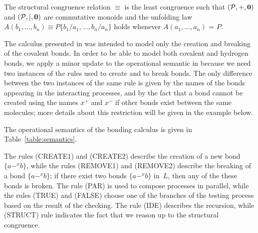 \documentclass[runningheads]{llncs}
\newcommand{\mP}{\mathcal{P}}
\begin{document}
The structural congruence relation $\equiv$ is the least congruence such 
that $(\mP,+,{\bf 0})$ and $(\mP,\mid,{\bf 0})$ are commutative monoids 
and the unfolding law $A(b_1,\ldots,b_n) \equiv 
P\{b_1/a_1,\ldots,b_n/a_n\}$ holds whenever $A(a_1,\ldots,a_n)$ = $P$.

The calculus presented in \cite{NaCo18} was intended to model only the 
creation and breaking of the covalent bonds. In order to be able to model 
both covalent and hydrogen bonds, we apply a minor update to the 
operational semantic in \cite{NaCo18} because we need two instances of the 
rules used to create and to break bonds. The only difference between the 
two instances of the same rule is given by the names of the bonds 
appearing in the interacting processes, and by the fact that a bond cannot 
be created using the names $x^+$ and $x^-$ if other bonds exist between 
the same molecules; more details about this restriction will be given in 
the example below.

The operational semantics of the bonding calculus is given in Table~\ref{table:semantics}.

The rules {\sf (CREATE1)} and {\sf (CREATE2)} describe the creation of a 
new bond $\{a-^x b\}$, while the rules {\sf (REMOVE1)} and {\sf (REMOVE2)} 
describe the breaking of a bond $\{a-^x b\}$; if there exist two bonds 
$\{a-^x b\}$ in~$L$, then any of the these bonds is broken. The rule 
{\sf (PAR}) is used to compose processes in parallel, while the rules 
{\sf (TRUE}) and {\sf (FALSE}) choose one of the branches of the testing 
process based on the result of the checking. The rule {\sf (IDE)} describes 
the recursion, while {\sf (STRUCT)} rule indicates the fact that we reason 
up to the structural congruence.
\end{document}
